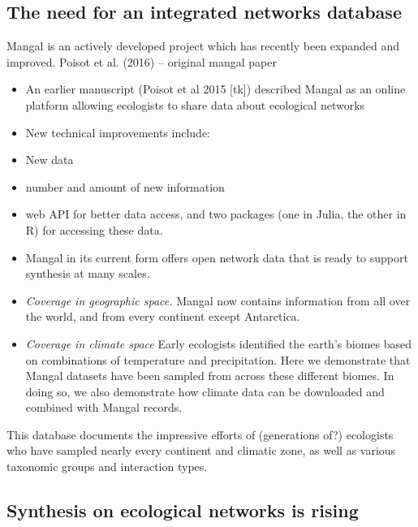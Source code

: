 \hypertarget{the-need-for-an-integrated-networks-database}{%
\subsection{The need for an integrated networks
database}\label{the-need-for-an-integrated-networks-database}}

Mangal is an actively developed project which has recently been expanded
and improved. Poisot et al. (2016) -- original mangal paper

\begin{itemize}
\tightlist
\item
  An earlier manuscript (Poisot et al 2015 {[}tk{]}) described Mangal as
  an online platform allowing ecologists to share data about ecological
  networks
\item
  New technical improvements include:
\item
  New data
\item
  number and amount of new information
\item
  web API for better data access, and two packages (one in Julia, the
  other in R) for accessing these data.
\item
  Mangal in its current form offers open network data that is ready to
  support synthesis at many scales.
\end{itemize}

\begin{itemize}
\item
  \emph{Coverage in geographic space.} Mangal now contains information
  from all over the world, and from every continent except Antarctica. 
\item
  \emph{Coverage in climate space} Early ecologists identified the
  earth's biomes based on combinations of temperature and precipitation.
  Here we demonstrate that Mangal datasets have been sampled from across
  these different biomes. In doing so, we also demonstrate how climate
  data can be downloaded and combined with Mangal records. 
\end{itemize}

This database documents the impressive efforts of (generations of?)
ecologists who have sampled nearly every continent and climatic zone, as
well as various taxonomic groups and interaction types.

\hypertarget{synthesis-on-ecological-networks-is-rising}{%
\subsection{Synthesis on ecological networks is
rising}\label{synthesis-on-ecological-networks-is-rising}}

